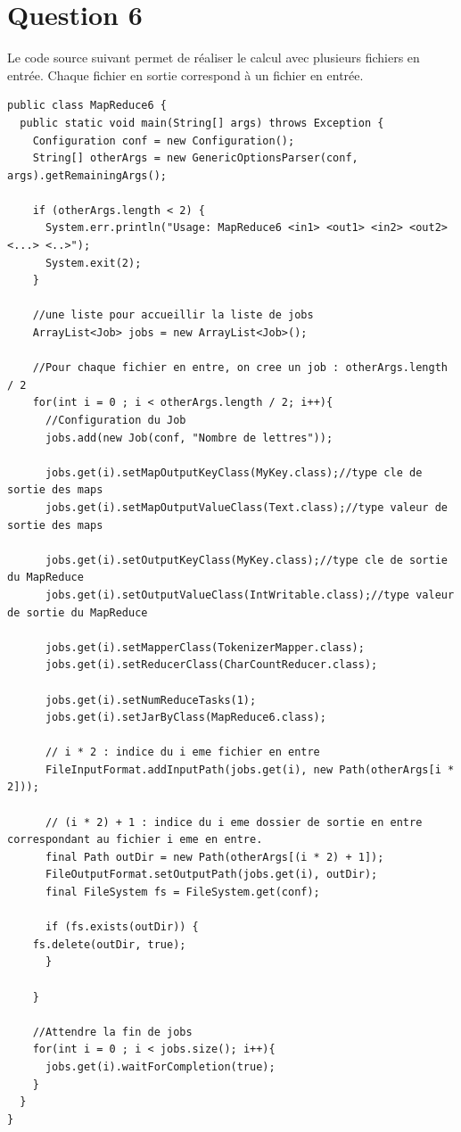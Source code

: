 \documentclass{article}
\begin{document}
  \section*{Question 6} 

    Le code source suivant permet de réaliser le calcul avec plusieurs fichiers
    en entrée. Chaque fichier en sortie correspond à un fichier en
    entrée. \medskip 

\begin{lstlisting}
public class MapReduce6 {
  public static void main(String[] args) throws Exception {	  
    Configuration conf = new Configuration();
    String[] otherArgs = new GenericOptionsParser(conf, args).getRemainingArgs();

    if (otherArgs.length < 2) {
      System.err.println("Usage: MapReduce6 <in1> <out1> <in2> <out2> <...> <..>");
      System.exit(2);
    }
		
    //une liste pour accueillir la liste de jobs
    ArrayList<Job> jobs = new ArrayList<Job>();
		
    //Pour chaque fichier en entre, on cree un job : otherArgs.length / 2
    for(int i = 0 ; i < otherArgs.length / 2; i++){
      //Configuration du Job
      jobs.add(new Job(conf, "Nombre de lettres"));
		
      jobs.get(i).setMapOutputKeyClass(MyKey.class);//type cle de sortie des maps
      jobs.get(i).setMapOutputValueClass(Text.class);//type valeur de sortie des maps	
		
      jobs.get(i).setOutputKeyClass(MyKey.class);//type cle de sortie du MapReduce
      jobs.get(i).setOutputValueClass(IntWritable.class);//type valeur de sortie du MapReduce

      jobs.get(i).setMapperClass(TokenizerMapper.class);
      jobs.get(i).setReducerClass(CharCountReducer.class);
		
      jobs.get(i).setNumReduceTasks(1);
      jobs.get(i).setJarByClass(MapReduce6.class); 
		
      // i * 2 : indice du i eme fichier en entre
      FileInputFormat.addInputPath(jobs.get(i), new Path(otherArgs[i * 2]));
	    		
      // (i * 2) + 1 : indice du i eme dossier de sortie en entre correspondant au fichier i eme en entre.
      final Path outDir = new Path(otherArgs[(i * 2) + 1]);
      FileOutputFormat.setOutputPath(jobs.get(i), outDir);
      final FileSystem fs = FileSystem.get(conf);
      
      if (fs.exists(outDir)) {
	fs.delete(outDir, true);
      }
	   
    }
		
    //Attendre la fin de jobs
    for(int i = 0 ; i < jobs.size(); i++){
      jobs.get(i).waitForCompletion(true);
    }
  }
}  
\end{lstlisting}
          
\end{document}
